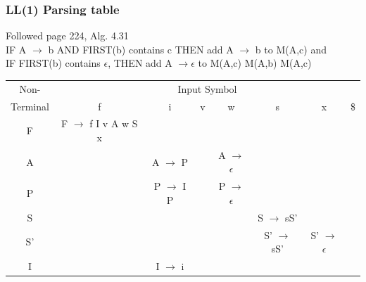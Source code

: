 \documentclass{article}
\begin{document}
\subsubsection*{LL(1) Parsing table}
Followed page 224, Alg. 4.31\\
IF A $\rightarrow$ b AND FIRST(b) contains c THEN add A $\rightarrow$ b to
M(A,c) and\\
IF FIRST(b) contains $\epsilon$, THEN add A $\rightarrow \epsilon$ to M(A,c)
M(A,b) M(A,c)\\
\begin{tabular}{|c|c|c|c|c|c|c|c|}
\hline
Non- & \multicolumn{7}{c|}{Input Symbol}\\
\cline{2-8}
Terminal & f & i & v & w & s & x & \$ \\
\hline
\hline
F  & F $\rightarrow$ f I v A w S x & & & & & & \\
\hline
A  & & A $\rightarrow$ P & & A $\rightarrow$ $\epsilon$ & & & \\
\hline
P  & & P $\rightarrow$ I P & & P $\rightarrow$ $\epsilon$ & & & \\
\hline
S  & & & & & S $\rightarrow$ sS' & & \\
\hline
S' & & & & & S' $\rightarrow$ sS' & S' $\rightarrow$ $\epsilon$ & \\
\hline
I  & & I $\rightarrow$ i & & & & & \\
\hline
\end{tabular}
\end{document}
